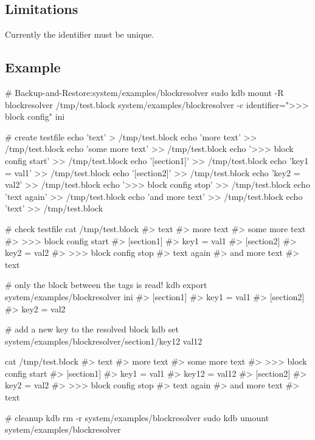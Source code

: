 \subsection*{Limitations}

Currently the identifier must be unique.

\subsection*{Example}


\begin{DoxyCode}
# Backup-and-Restore:system/examples/blockresolver
sudo kdb mount -R blockresolver /tmp/test.block system/examples/blockresolver -c identifier=">>> block
       config" ini

# create testfile
echo 'text'                   >  /tmp/test.block
echo 'more text'              >> /tmp/test.block
echo 'some more text'         >> /tmp/test.block
echo '>>> block config start' >> /tmp/test.block
echo '[section1]'             >> /tmp/test.block
echo 'key1 = val1'            >> /tmp/test.block
echo '[section2]'             >> /tmp/test.block
echo 'key2 = val2'            >> /tmp/test.block
echo '>>> block config stop'  >> /tmp/test.block
echo 'text again'             >> /tmp/test.block
echo 'and more text'          >> /tmp/test.block
echo 'text'                   >> /tmp/test.block

# check testfile
cat /tmp/test.block
#> text
#> more text
#> some more text
#> >>> block config start
#> [section1]
#> key1 = val1
#> [section2]
#> key2 = val2
#> >>> block config stop
#> text again
#> and more text
#> text

# only the block between the tags is read!
kdb export system/examples/blockresolver ini
#> [section1]
#> key1 = val1
#> [section2]
#> key2 = val2

# add a new key to the resolved block
kdb set system/examples/blockresolver/section1/key12 val12

cat /tmp/test.block
#> text
#> more text
#> some more text
#> >>> block config start
#> [section1]
#> key1 = val1
#> key12 = val12
#> [section2]
#> key2 = val2
#> >>> block config stop
#> text again
#> and more text
#> text

# cleanup
kdb rm -r system/examples/blockresolver
sudo kdb umount system/examples/blockresolver
\end{DoxyCode}
 